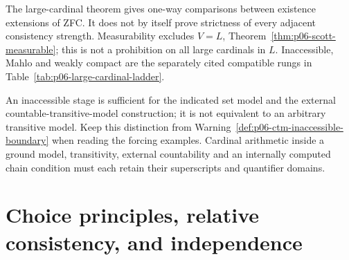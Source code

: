 The large-cardinal theorem gives one-way comparisons between existence
extensions of ZFC. It does not by itself prove strictness of every adjacent
consistency strength. Measurability excludes \(V=L\),
Theorem~\ref{thm:p06-scott-measurable}; this is not a prohibition on all
large cardinals in \(L\). Inaccessible, Mahlo and weakly compact are the
separately cited compatible rungs in
Table~\ref{tab:p06-large-cardinal-ladder}.

An inaccessible stage is sufficient for the indicated set model and the
external countable-transitive-model construction; it is not equivalent to an
arbitrary transitive model. Keep this distinction from
Warning~\ref{def:p06-ctm-inaccessible-boundary} when reading the forcing
examples. Cardinal arithmetic inside a ground model, transitivity, external
countability and an internally computed chain condition must each retain
their superscripts and quantifier domains.

\section{Choice principles, relative consistency, and independence}
\label{sec:p14-strength-choice-independence}


